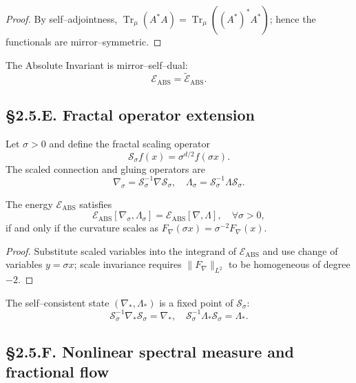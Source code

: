 \begin{proof}
By self–adjointness, $\operatorname{Tr}_\mu(A^\ast A)=\operatorname{Tr}_\mu((A^\ast)^\ast A^\ast)$; hence the functionals are mirror–symmetric.
\end{proof}

\begin{corollary}
The Absolute Invariant is mirror–self–dual:
\[
\mathcal{E}_{\mathrm{ABS}}=\widetilde{\mathcal{E}}_{\mathrm{ABS}}.
\]
\end{corollary}

\subsection*{§2.5.E. Fractal operator extension}

\begin{definition}
Let $\sigma>0$ and define the fractal scaling operator
\[
\mathcal{S}_\sigma f(x)=\sigma^{d/2}f(\sigma x).
\]
The scaled connection and gluing operators are
\[
\nabla_\sigma = \mathcal{S}_\sigma^{-1}\nabla\mathcal{S}_\sigma,\quad
\Lambda_\sigma = \mathcal{S}_\sigma^{-1}\Lambda\mathcal{S}_\sigma.
\]
\]
\end{definition}

\begin{theorem}\label{thm:2.5.fractal}
The energy $\mathcal{E}_{\mathrm{ABS}}$ satisfies
\[
\mathcal{E}_{\mathrm{ABS}}[\nabla_\sigma,\Lambda_\sigma]
=\mathcal{E}_{\mathrm{ABS}}[\nabla,\Lambda],
\quad \forall\sigma>0,
\]
if and only if the curvature scales as $F_\nabla(\sigma x)=\sigma^{-2}F_\nabla(x)$.
\end{theorem}

\begin{proof}
Substitute scaled variables into the integrand of $\mathcal{E}_{\mathrm{ABS}}$ and use change of variables $y=\sigma x$; scale invariance requires $\|F_\nabla\|_{L^2}$ to be homogeneous of degree $-2$.
\end{proof}

\begin{corollary}
The self–consistent state $(\nabla_\ast,\Lambda_\ast)$ is a fixed point of $\mathcal{S}_\sigma$:
\[
\mathcal{S}_\sigma^{-1}\nabla_\ast\mathcal{S}_\sigma=\nabla_\ast,
\quad
\mathcal{S}_\sigma^{-1}\Lambda_\ast\mathcal{S}_\sigma=\Lambda_\ast.
\]
\end{corollary}

\subsection*{§2.5.F. Nonlinear spectral measure and fractional flow}

